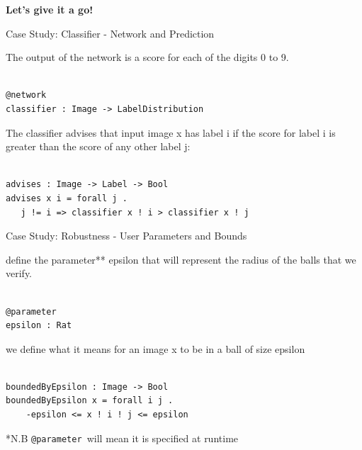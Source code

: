 \documentclass[t,compress,aspectratio=169]{beamer}
\begin{document}
\begin{frame}
\vspace {8em}

    \begin{center}
        \Huge{\textcolor{aisecred}{\textbf{Let's give it a go!}}}
    \end{center}
\end{frame}




\begin{frame}[fragile]{Case Study: Classifier - Network and Prediction}


The output of the network is a score for each of the digits 0 to 9.

\begin{verbatim}

@network
classifier : Image -> LabelDistribution

\end{verbatim}



The classifier advises that input image x has label i if the score for label i is greater than the score of any other label j:


\begin{verbatim}

advises : Image -> Label -> Bool
advises x i = forall j .
   j != i => classifier x ! i > classifier x ! j

\end{verbatim}
\end{frame}


\begin{frame}[fragile]{Case Study: Robustness - User Parameters and Bounds}

define the parameter** epsilon that will represent the radius of the balls that we verify.

\begin{verbatim}

@parameter
epsilon : Rat
\end{verbatim}

 we define what it means for an image x to be in a ball of size epsilon

\begin{verbatim}

boundedByEpsilon : Image -> Bool
boundedByEpsilon x = forall i j .
    -epsilon <= x ! i ! j <= epsilon

\end{verbatim}


\footnotesize **N.B \texttt{@parameter }will mean it is specified at runtime

\end{frame}
\end{document}
